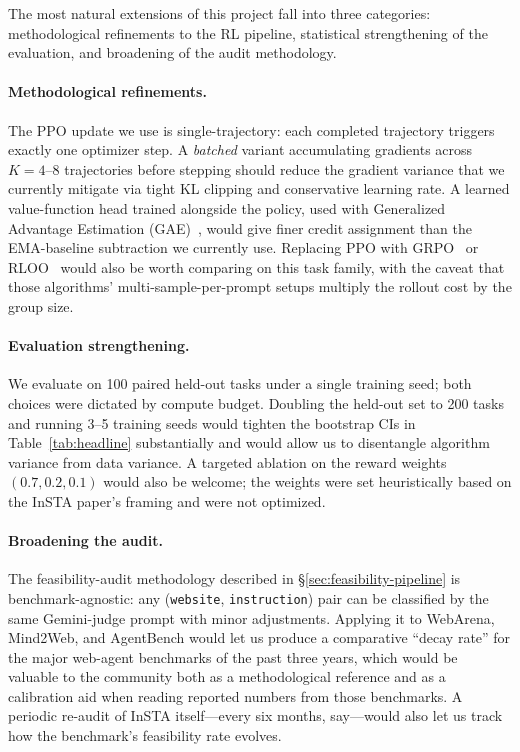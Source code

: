 \documentclass[12pt,a4paper]{report}
\begin{document}
The most natural extensions of this project fall into three categories: methodological refinements to the RL pipeline, statistical strengthening of the evaluation, and broadening of the audit methodology.

\paragraph{Methodological refinements.} The PPO update we use is single-trajectory: each completed trajectory triggers exactly one optimizer step. A \emph{batched} variant accumulating gradients across $K = 4$--$8$ trajectories before stepping should reduce the gradient variance that we currently mitigate via tight KL clipping and conservative learning rate. A learned value-function head trained alongside the policy, used with Generalized Advantage Estimation (GAE)~\cite{schulman2015gae}, would give finer credit assignment than the EMA-baseline subtraction we currently use. Replacing PPO with GRPO~\cite{shao2024deepseekmath} or RLOO~\cite{ahmadian2024rloo} would also be worth comparing on this task family, with the caveat that those algorithms' multi-sample-per-prompt setups multiply the rollout cost by the group size.

\paragraph{Evaluation strengthening.} We evaluate on 100 paired held-out tasks under a single training seed; both choices were dictated by compute budget. Doubling the held-out set to 200 tasks and running 3--5 training seeds would tighten the bootstrap CIs in Table~\ref{tab:headline} substantially and would allow us to disentangle algorithm variance from data variance. A targeted ablation on the reward weights $(0.7, 0.2, 0.1)$ would also be welcome; the weights were set heuristically based on the InSTA paper's framing and were not optimized.

\paragraph{Broadening the audit.} The feasibility-audit methodology described in \S\ref{sec:feasibility-pipeline} is benchmark-agnostic: any (\texttt{website}, \texttt{instruction}) pair can be classified by the same Gemini-judge prompt with minor adjustments. Applying it to WebArena, Mind2Web, and AgentBench would let us produce a comparative ``decay rate'' for the major web-agent benchmarks of the past three years, which would be valuable to the community both as a methodological reference and as a calibration aid when reading reported numbers from those benchmarks. A periodic re-audit of InSTA itself---every six months, say---would also let us track how the benchmark's feasibility rate evolves.
\end{document}
